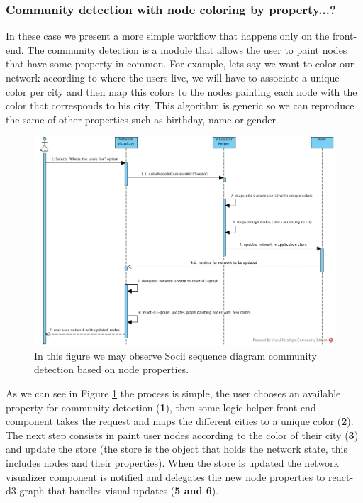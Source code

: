 \subsubsection{Community detection with node coloring by property...?}

In these case we present a more simple workflow that happens only on the front-end. The community detection is a module that allows the user to paint nodes that have some property in common. For example, lets say we want to color our network according to where the users live, we will have to associate a unique color per city and then map this colors to the nodes painting each node with the color that corresponds to his city. This algorithm is generic so we can reproduce the same of other properties such as birthday, name or gender.

\begin{figure}[h!]
\begin{center}
  \hspace*{-0.8in}
  \includegraphics[width=1.2\textwidth]{img/socii-cdet.jpg}
\end{center}
\caption{\label{img:sociicdet} In this figure we may observe Socii sequence diagram community detection based on node properties.}
\end{figure}

As we can see in Figure \ref{img:sociicdet} the process is simple, the user chooses an available property for community detection (\textbf{1}), then some logic helper front-end component takes the request and maps the different cities to a unique color (\textbf{2}). The next step consists in paint user nodes according to the color of their city (\textbf{3}) and update the store (the store is the object that holds the network state, this includes nodes and their properties). When the store is updated the network visualizer component is notified and delegates the new node properties to react-d3-graph that handles visual updates (\textbf{5 and 6}).